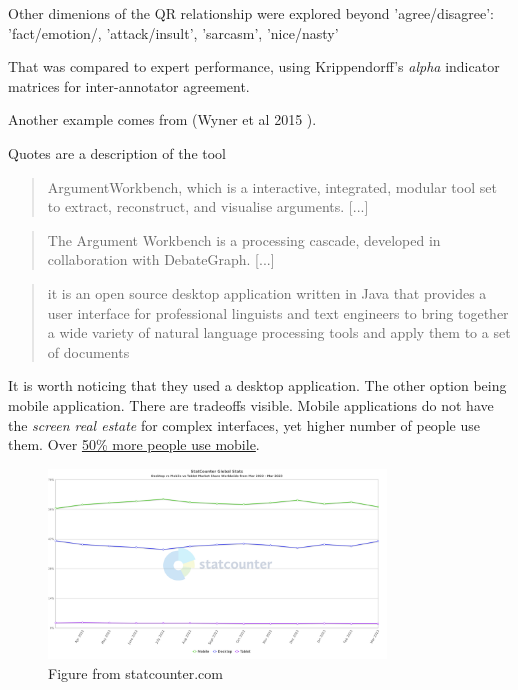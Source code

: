 \documentclass{report}
\begin{document}
Other dimenions of the QR relationship were explored beyond 'agree/disagree': 'fact/emotion/, 'attack/insult', 'sarcasm', 'nice/nasty'

That was compared to expert performance, using Krippendorff's \textit{alpha} indicator matrices for inter-annotator agreement.

Another example comes from (Wyner et al 2015 ).

Quotes are a description of the tool
\begin{quote}
 ArgumentWorkbench, which is a interactive, integrated, modular tool set to extract, reconstruct, and visualise arguments. [...]
\end{quote}
\begin{quote}
 The Argument Workbench is a processing cascade, developed in collaboration with DebateGraph. [...]
\end{quote}
\begin{quote}
 it is an open source desktop application written in Java that provides a user interface for professional linguists and text engineers to bring together a wide variety of natural language processing tools and apply them to a set of documents
\end{quote}

It is worth noticing that they used a desktop application. The other option being mobile application. There are tradeoffs visible.
Mobile applications do not have the \textit{screen real estate} for complex interfaces, yet higher number of people use them. Over \href{https:\\gs.statcounter.com/platform-market-share/desktop-mobile-tablet}{50\% more people use mobile}.

\begin{figure}[h]
    \centering
    \includegraphics[width=0.8\textwidth]{./images/StatCounter-comparison-ww-monthly-202203-202303.png}
    \caption{Figure from statcounter.com}
\end{figure}
\end{document}

